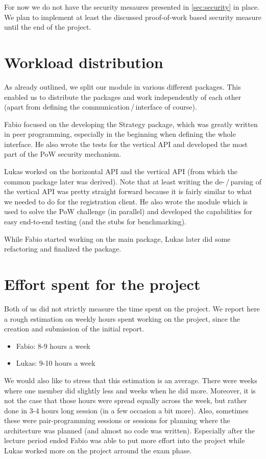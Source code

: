 \documentclass[a4paper,english,10pt,NET]{tumarticle}
\begin{document}
For now we do not have the security mesaures presented in \cref{sec:security} in place.
We plan to implement at least the discussed proof-of-work based security measure until the end of the project.

\section{Workload distribution}
As already outlined, we split our module in various different packages.
This enabled us to distribute the packages and work independently of each other (apart from defining the communication\,/\,interface of course).

Fabio focused on the developing the Strategy package, which was greatly written in peer programming, especially in the beginning when defining the whole interface. He also wrote the tests for the vertical API and developed the most part of the PoW security mechanism.

Lukas worked on the horizontal API and the vertical API (from which the common package later was derived).
Note that at least writing the de-\,/\,parsing of the vertical API was pretty straight forward because it is fairly similar to what we needed to do for the registration client.
He also wrote the module which is used to solve the PoW challenge (in parallel) and developed the capabilities for easy end-to-end testing (and the stubs for benchmarking).

While Fabio started working on the main package, Lukas later did some refactoring and finalized the package.

\section{Effort spent for the project}
Both of us did not strictly measure the time spent on the project. We report here a rough estimation on weekly hours spent working on the project, since the creation and submission of the initial report.

\begin{itemize}
	\item Fabio: 8-9 hours a week
	\item Lukas: 9-10 hours a week
\end{itemize}

We would also like to stress that this estimation is an average.
There were weeks where one member did slightly less and weeks when he did more.
Moreover, it is not the case that those hours were spread equally across the week, but rather done in 3-4 hours long session (in a few occasion a bit more).
Also, sometimes these were pair-programming sessions or sessions for planning where the architecture was planned (and almost no code was written).
Especially after the lecture period ended Fabio was able to put more effort into the project while Lukas worked more on the project arround the exam phase.

\todos
\end{document}
